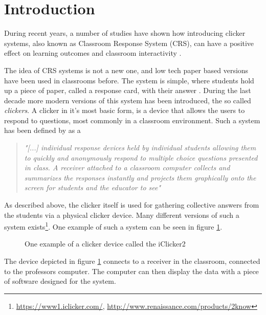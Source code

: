\section{Introduction}
During recent years, a number of studies have shown how introducing clicker systems, also known as Classroom Response System (CRS), can have a positive effect on learning outcomes and classroom interactivity \cite{yourstone2008classroom, siau2006use, lantz2014effectiveness}.

The idea of CRS systems is not a new one, and low tech paper based versions have been used in classrooms before. The system is simple, where students hold up a piece of paper, called a response card, with their answer \cite{ralph1994effects}. During the last decade more modern versions of this system has been introduced, the so called \emph{clickers}. A clicker in it's most basic form, is a device that allows the users to respond to questions, most commonly in a classroom environment. Such a system has been defined by  as a 

\begin{quote}
    \emph{"[...] individual response devices held by individual students allowing them to quickly and anonymously respond to multiple choice questions presented in class. A receiver attached to a classroom computer collects and summarizes the responses instantly and projects them graphically onto the screen for students and the educator to see"} \cite[p.~280]{lantz2014effectiveness}
\end{quote}

As described above, the clicker itself is used for gathering collective answers from the students via a physical clicker device. Many different versions of such a system exists\footnote{\url{https://www1.iclicker.com/}, \url{http://www.renaissance.com/products/2know}}. One example of such a system can be seen in figure \ref{fig:iclicker}.

\begin{figure}[H]
\capstart
	\centering
	\caption[iClicker2]{One example of a clicker device called the iClicker2 \label{fig:iclicker}}
\end{figure}

The device depicted in figure \ref{fig:iclicker} connects to a receiver in the classroom, connected to the professors computer. The computer can then display the data with a piece of software designed for the system. 

